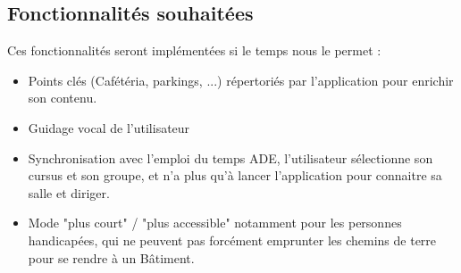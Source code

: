 \documentclass{article}
\begin{document}
	\subsection{Fonctionnalités souhaitées}
	Ces fonctionnalités seront implémentées si le temps nous le permet :
	\begin{itemize}
		\item Points clés (Cafétéria, parkings, ...) répertoriés par l'application pour enrichir son contenu.
		\item Guidage vocal de l'utilisateur
		\item Synchronisation avec l'emploi du temps ADE, l'utilisateur sélectionne son cursus et son groupe, et n'a plus qu'à lancer l'application pour connaitre sa salle et diriger.
		\item Mode "plus court" / "plus accessible" notamment pour les personnes handicapées, qui ne peuvent pas forcément emprunter les chemins de terre pour se rendre à un Bâtiment.
	\end{itemize}
	
\end{document}
